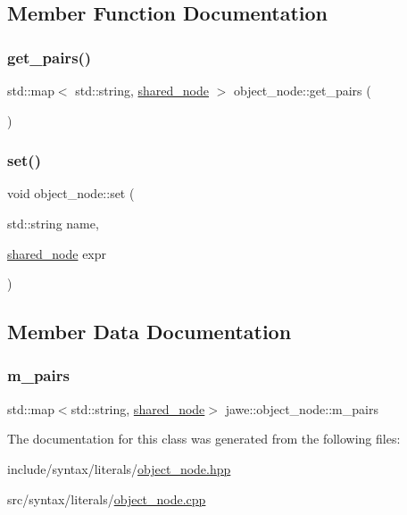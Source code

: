 \subsection{Member Function Documentation}
\mbox{\label{classjawe_1_1object__node_ab8b07adcd640a699b3a67f151d9dee19}} 
\subsubsection{\texorpdfstring{get\+\_\+pairs()}{get\_pairs()}}
{\footnotesize\ttfamily std\+::map$<$ std\+::string, \hyperlink{namespacejawe_a3f307481d921b6cbb50cc8511fc2b544}{shared\+\_\+node} $>$ object\+\_\+node\+::get\+\_\+pairs (\begin{DoxyParamCaption}{ }\end{DoxyParamCaption})}

\mbox{\label{classjawe_1_1object__node_a0a46b9bedc1c5dcbaa65bcde48b29787}} 
\subsubsection{\texorpdfstring{set()}{set()}}
{\footnotesize\ttfamily void object\+\_\+node\+::set (\begin{DoxyParamCaption}\item[{std\+::string}]{name,  }\item[{\hyperlink{namespacejawe_a3f307481d921b6cbb50cc8511fc2b544}{shared\+\_\+node}}]{expr }\end{DoxyParamCaption})}



\subsection{Member Data Documentation}
\mbox{\label{classjawe_1_1object__node_ae2e895d47d9fcc39e68543b191455559}} 
\subsubsection{\texorpdfstring{m\+\_\+pairs}{m\_pairs}}
{\footnotesize\ttfamily std\+::map$<$std\+::string, \hyperlink{namespacejawe_a3f307481d921b6cbb50cc8511fc2b544}{shared\+\_\+node}$>$ jawe\+::object\+\_\+node\+::m\+\_\+pairs\hspace{0.3cm}{\ttfamily [private]}}



The documentation for this class was generated from the following files\+:\begin{DoxyCompactItemize}
\item 
include/syntax/literals/\hyperlink{object__node_8hpp}{object\+\_\+node.\+hpp}\item 
src/syntax/literals/\hyperlink{object__node_8cpp}{object\+\_\+node.\+cpp}\end{DoxyCompactItemize}
